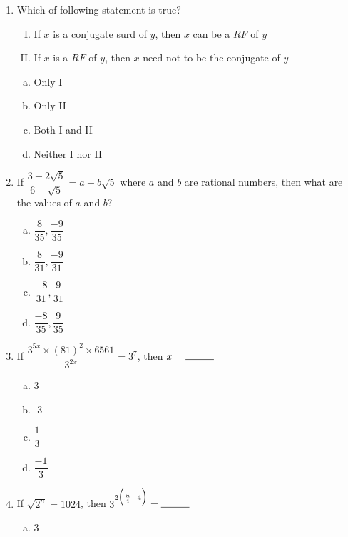 \begin{multicols}{2}
\begin{enumerate}
\begin{multicols}{2}
\begin{enumerate}[(a)]
\end{enumerate}
\end{multicols}
\item Which of following statement is true?
\begin{enumerate}[I.]
\item If $x$ is a conjugate surd of $y$, then $x$ can be a $RF$ of $y$
\item If $x$ is a $RF$ of $y$, then $x$ need not to be the conjugate of $y$
\end{enumerate}
\begin{multicols}{2}
\begin{enumerate}[(a)]
\item Only I
\item Only II
\item Both I and II
\item Neither I nor II
\end{enumerate}
\end{multicols}
\item If $\dfrac{3-2\sqrt{5}}{6-\sqrt{5}} = a+b\sqrt{5}$ where $a$ and $b$ are rational numbers, then what are the values of $a$ and $b$?
\begin{multicols}{2}
\begin{enumerate}[(a)]
\item $\dfrac{8}{35},\dfrac{-9}{35}$
\item $\dfrac{8}{31},\dfrac{-9}{31}$
\item $\dfrac{-8}{31},\dfrac{9}{31}$
\item $\dfrac{-8}{35},\dfrac{9}{35}$
\end{enumerate}
\end{multicols}
\item If $\dfrac{3^{5x}\times(81)^2\times6561}{3^{2x}} = 3^7$, then $x = \rule{1cm}{0.15mm}$
\begin{multicols}{2}
\begin{enumerate}[(a)]
\item 3
\item -3
\item $\dfrac{1}{3}$
\item $\dfrac{-1}{3}$
\end{enumerate}
\end{multicols}
\item If $\sqrt{2^n} = 1024$, then $3^{2\Big(\frac{n}{4}-4\Big)} = \rule{1cm}{0.15mm}$
\begin{multicols}{2}
\begin{enumerate}[(a)]
\item 3

\end{enumerate}
\end{multicols}
\end{enumerate}
\end{multicols}
